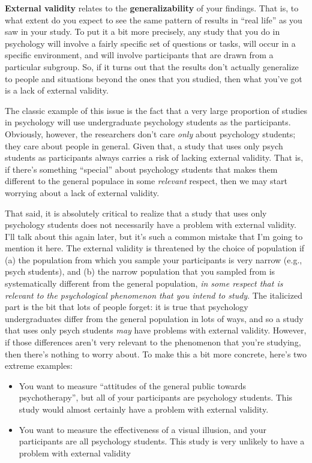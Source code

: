 \documentclass[]{book}
\begin{document}
\textbf{External validity} relates to the \textbf{generalizability} of your findings. That is, to what extent do you expect to see the same pattern of results in ``real life'' as you saw in your study. To put it a bit more precisely, any study that you do in psychology will involve a fairly specific set of questions or tasks, will occur in a specific environment, and will involve participants that are drawn from a particular subgroup. So, if it turns out that the results don't actually generalize to people and situations beyond the ones that you studied, then what you've got is a lack of external validity.

The classic example of this issue is the fact that a very large proportion of studies in psychology will use undergraduate psychology students as the participants. Obviously, however, the researchers don't care {\emph{only}} about psychology students; they care about people in general. Given that, a study that uses only psych students as participants always carries a risk of lacking external validity. That is, if there's something ``special'' about psychology students that makes them different to the general populace in some {\emph{relevant}} respect, then we may start worrying about a lack of external validity.

That said, it is absolutely critical to realize that a study that uses only psychology students does not necessarily have a problem with external validity. I'll talk about this again later, but it's such a common mistake that I'm going to mention it here. The external validity is threatened by the choice of population if (a) the population from which you sample your participants is very narrow (e.g., psych students), and (b) the narrow population that you sampled from is systematically different from the general population, {\emph{in some respect that is relevant to the psychological phenomenon that you intend to study}}. The italicized part is the bit that lots of people forget: it is true that psychology undergraduates differ from the general population in lots of ways, and so a study that uses only psych students {\emph{may}} have problems with external validity. However, if those differences aren't very relevant to the phenomenon that you're studying, then there's nothing to worry about. To make this a bit more concrete, here's two extreme examples:

\begin{itemize}
\item
  You want to measure ``attitudes of the general public towards psychotherapy'', but all of your participants are psychology students. This study would almost certainly have a problem with external validity.
\item
  You want to measure the effectiveness of a visual illusion, and your participants are all psychology students. This study is very unlikely to have a problem with external validity
\end{itemize}
\end{document}
